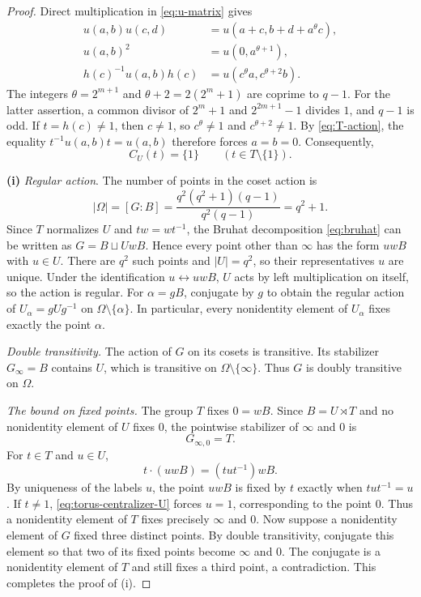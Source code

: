 \documentclass[11pt]{amsart}
\numberwithin{equation}{section}
\theoremstyle{definition}
\theoremstyle{remark}
\begin{document}
\begin{proof}
Direct multiplication in \eqref{eq:u-matrix} gives
\begin{align}
 u(a,b)u(c,d)&=u(a+c,b+d+a^\theta c),\label{eq:U-product}\\
 u(a,b)^2&=u(0,a^{\theta+1}),\label{eq:U-square}\\
 h(c)^{-1}u(a,b)h(c)&=u(c^\theta a,c^{\theta+2}b).
 \label{eq:T-action}
\end{align}
The integers $\theta = 2^{m+1}$ and $\theta+2 = 2(2^{m}+1)$ are coprime to $q-1$. 
For the latter assertion, a common divisor of $2^m+1$ and $2^{2m+1}-1$ divides $1$, and $q-1$ is odd. 
If $t=h(c)\ne1$, then $c\ne1$, so $c^\theta\ne1$ and $c^{\theta+2}\ne1$. 
By \eqref{eq:T-action}, the equality $t^{-1}u(a,b)t=u(a,b)$ therefore forces $a=b=0$. Consequently,
\begin{equation}\label{eq:torus-centralizer-U}
C_U(t)=\{1\}\qquad(t\in T\setminus\{1\}).
\end{equation}

\textbf{(i)} \emph{Regular action}. 
The number of points in the coset action is
\[
 |\Omega|=[G:B]
 =\frac{q^2(q^2+1)(q-1)}{q^2(q-1)}=q^2+1.
\]
Since $T$ normalizes $U$ and $tw=wt^{-1}$, the Bruhat decomposition \eqref{eq:bruhat} can be written as $G=B\sqcup UwB$.
Hence every point other than $\infty$ has the form $uwB$ with $u\in U$. 
There are $q^2$ such points and $|U|=q^2$, so their representatives $u$ are unique. 
Under the identification \(u\leftrightarrow uwB\), \(U\) acts by left multiplication on itself, so the action is regular.
For \(\alpha=gB\), conjugate by $g$ to obtain the regular action of $U_\alpha=gUg^{-1}$ on $\Omega\setminus\{\alpha\}$. 
In particular, every nonidentity element of $U_\alpha$ fixes exactly the point $\alpha$.

\emph{Double transitivity.}
The action of $G$ on its cosets is transitive. 
Its stabilizer $G_\infty=B$ contains $U$, which is transitive on $\Omega \setminus \{\infty\}$. 
Thus $G$ is doubly transitive on $\Omega$.

\emph{The bound on fixed points.}
The group $T$ fixes $0=wB$.
Since $B=U \rtimes T$ and no nonidentity element of $U$ fixes $0$, the pointwise stabilizer of $\infty$ and $0$ is
\[
 G_{\infty,0}=T.
\]
For $t\in T$ and $u\in U$,
\[
 t\cdot(uwB)=(tut^{-1})wB.
\]
By uniqueness of the labels $u$, the point $uwB$ is fixed by $t$ exactly when $tut^{-1}=u$. 
If $t\ne1$, \eqref{eq:torus-centralizer-U} forces $u=1$, corresponding to the point $0$. 
Thus a nonidentity element of $T$ fixes precisely $\infty$ and $0$.
Now suppose a nonidentity element of $G$ fixed three distinct points.
By double transitivity, conjugate this element so that two of its fixed points become $\infty$ and $0$. The conjugate is a nonidentity element of $T$ and still fixes a third point, a contradiction.
This completes the proof of (i).


\end{proof}
\end{document}
